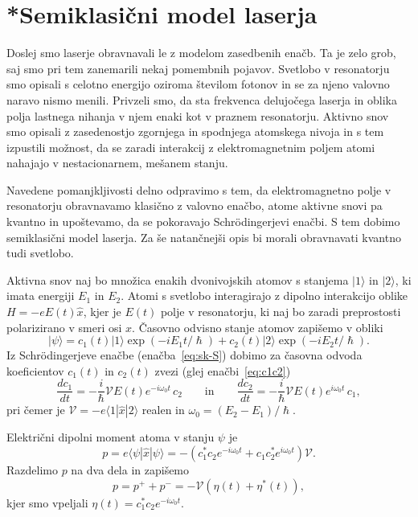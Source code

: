 \section{*Semiklasični model laserja}
\label{chap:semiklasicni}
Doslej smo laserje obravnavali le z modelom zasedbenih enačb. Ta je zelo
grob, saj smo pri tem zanemarili nekaj pomembnih pojavov. Svetlobo v 
resonatorju smo opisali s celotno energijo oziroma številom fotonov in se za
njeno valovno naravo nismo menili. Privzeli smo, da sta frekvenca
delujočega laserja in oblika polja lastnega nihanja v njem enaki kot v
praznem resonatorju. Aktivno snov smo opisali z zasedenostjo zgornjega
in spodnjega atomskega nivoja in s tem izpustili možnost, da se zaradi
interakcij z elektromagnetnim poljem atomi nahajajo v nestacionarnem,
mešanem stanju.

Navedene pomanjkljivosti delno odpravimo s tem, da elektromagnetno polje v
resonatorju obravnavamo klasično z valovno enačbo, atome aktivne snovi pa
kvantno in upoštevamo, da se pokoravajo Schr\"odingerjevi enačbi. S tem dobimo 
semiklasični model laserja. Za še natančnejši opis bi morali obravnavati
kvantno tudi svetlobo.

Aktivna snov naj bo množica enakih dvonivojskih 
atomov s stanjema $|1\rangle$ in $|2\rangle$, ki imata energiji $E_1$ in $E_2$.
Atomi s svetlobo interagirajo z dipolno interakcijo oblike $H = -eE(t)\hat{x}$, 
kjer je $E(t)$ polje v resonatorju, ki naj bo zaradi preprostosti 
polarizirano v smeri osi $x$. Časovno odvisno stanje atomov
zapišemo v obliki 
\begin{equation}  \label{5.45}
|\psi\rangle=c_1(t)|1\rangle\exp(-iE_1t/\hslash)+
c_2(t)|2\rangle\exp(-iE_2t/\hslash).
\end{equation}
Iz Schr\"odingerjeve enačbe (enačba~\ref{eq:sk-S}) dobimo za časovna odvoda
koeficientov $c_1(t)$ in $c_2(t)$ zvezi
(glej enačbi~\ref{eq:c1c2})
\begin{equation}
\frac{d c_1}{dt}=-\frac{i}{\hslash} \mathcal{V} E(t) e^{-i\omega_0 t}\, c_2 
\qquad \mathrm{in} \qquad
\frac{d c_2}{dt}=-\frac{i}{\hslash} \mathcal{V} E(t) e^{i\omega_0 t}\, c_1,
\label{5.46}
\end{equation}
pri čemer je $\mathcal{V} = -e\langle1|\hat{x}|2\rangle$ realen in $\omega_0=(E_2-E_1)/\hslash$.

Električni dipolni moment atoma v stanju ${\psi}$ je 
\begin{equation}  
\label{5.47}
p=e\langle\psi|\hat{x}|\psi\rangle=-
(c_1^{\ast}c_2e^{-i \omega_0t}+c_1c_2^{\ast}e^{i \omega_0 t}) \mathcal{V}.
\end{equation}
Razdelimo $p$ na dva dela in zapišemo
\begin{equation}  
\label{5.48}
p=p^+ + p^-=-\mathcal{V}\left(\eta(t)+\eta^{\ast}(t)\right),
\end{equation}
kjer smo vpeljali $\eta(t)=c_1^{\ast}c_2e^{-i \omega_0 t}$.

